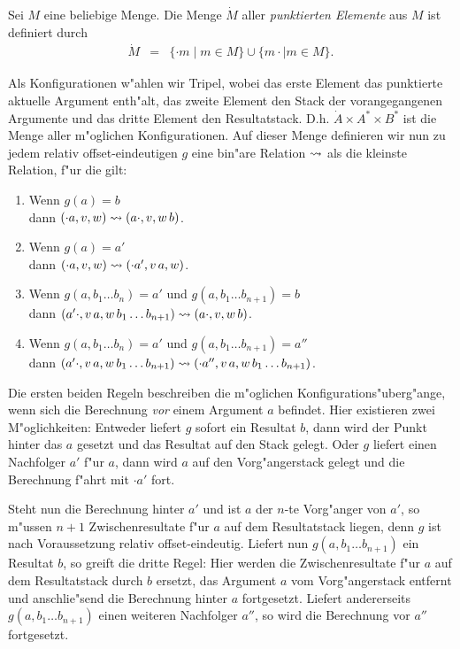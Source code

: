 \documentclass[12pt,a4paper]{article}
\begin{document}
\begin{definition}
  Sei $M$ eine beliebige Menge. Die Menge $\dot{M}$ aller \emph{punktierten Elemente} aus
  $M$ ist definiert durch
  \[\begin{array}{rcl}
    \dot{M} &=& \{\cdot m \mid m \in M\} \cup \{m \cdot \mid m \in M\}.
  \end{array}\]
\end{definition}

Als Konfigurationen w"ahlen wir Tripel, wobei das erste Element das punktierte aktuelle Argument
enth"alt, das zweite Element den Stack der vorangegangenen Argumente und das dritte Element den
Resultatstack. D.h. $\dot{A} \times A^* \times B^*$ ist die Menge aller m"oglichen Konfigurationen.
Auf dieser Menge definieren wir nun zu jedem relativ offset-eindeutigen $g$ eine bin"are Relation
$\rightsquigarrow$ als die kleinste Relation, f"ur die gilt:
\begin{enumerate}
\item Wenn $g(a) = b$ \\
  dann $(\cdot a,v,w) \rightsquigarrow (a \cdot,v,w\,b)$.
\item Wenn $g(a) = a'$ \\
  dann $(\cdot a,v,w) \rightsquigarrow (\cdot a',v\,a,w)$.
\item Wenn $g(a,b_1 \ldots b_n) = a'$ und $g(a,b_1 \ldots b_{n+1}) = b$ \\
  dann $(a' \cdot,v\,a,w\,b_1 \ldots b_{n+1}) \rightsquigarrow (a \cdot,v,w\,b)$.
\item Wenn $g(a,b_1 \ldots b_n) = a'$ und $g(a,b_1 \ldots b_{n+1}) = a''$ \\
  dann $(a' \cdot,v\,a,w\,b_1 \ldots b_{n+1}) \rightsquigarrow (\cdot a'',v\,a,w\,b_1 \ldots b_{n+1})$.
\end{enumerate}

Die ersten beiden Regeln beschreiben die m"oglichen Konfigurations"uberg"ange, wenn sich die Berechnung
\emph{vor} einem Argument $a$ befindet. Hier existieren zwei M"oglichkeiten: Entweder liefert $g$ sofort
ein Resultat $b$, dann wird der Punkt hinter das $a$ gesetzt und das Resultat auf den Stack gelegt. Oder
$g$ liefert einen Nachfolger $a'$ f"ur $a$, dann wird $a$ auf den Vorg"angerstack gelegt und die Berechnung
f"ahrt mit $\cdot a'$ fort.

Steht nun die Berechnung hinter $a'$ und ist $a$ der $n$-te Vorg"anger von $a'$, so m"ussen $n+1$
Zwischenresultate f"ur $a$ auf dem Resultatstack liegen, denn $g$ ist nach Voraussetzung relativ
offset-eindeutig. Liefert nun $g(a,b_1 \ldots b_{n+1})$ ein Resultat $b$, so greift die dritte
Regel: Hier werden die Zwischenresultate f"ur $a$ auf dem Resultatstack durch $b$ ersetzt, das
Argument $a$ vom Vorg"angerstack entfernt und anschlie"send die Berechnung hinter $a$ fortgesetzt.
Liefert andererseits $g(a,b_1 \ldots b_{n+1})$ einen weiteren Nachfolger $a''$, so wird die Berechnung
vor $a''$ fortgesetzt.
\end{document}
